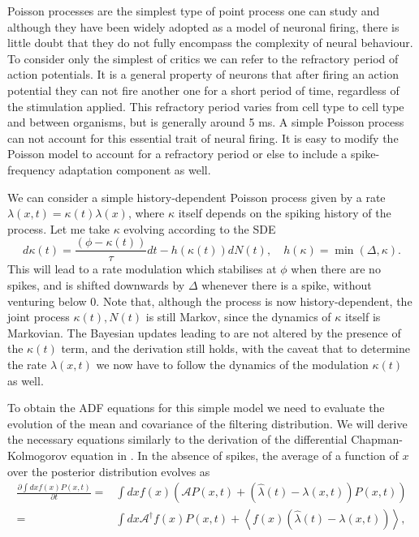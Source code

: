 Poisson processes are the simplest type of point process one can study and although they have been widely adopted as a model of neuronal firing, there is little doubt
that they do not fully encompass the complexity of neural behaviour. To consider only the simplest of critics we can refer to the refractory period of action potentials. It
is a general property of neurons that after firing an action potential they can not fire another one for a short period of time, regardless of the stimulation applied. This
refractory period varies from cell type to cell type and between organisms, but is generally around 5 ms. A simple Poisson process can not account for this
essential trait of neural firing. It is easy to modify the Poisson model to account for a refractory period or else to include a spike-frequency adaptation component
as well.\par
We can consider a simple history-dependent Poisson process given by a rate $\lambda(x,t) = \kappa(t) \lambda(x)$, where $\kappa$ itself depends on the
spiking history of the process. Let me take $\kappa$ evolving according to the SDE
\[
d\kappa(t) = \frac{(\phi - \kappa(t))}{\tau} dt - h(\kappa(t)) dN(t), \quad h(\kappa) = \min(\Delta, \kappa).
\]
This will lead to a rate modulation which stabilises at $\phi$ when there are no spikes, and is shifted downwards by $\Delta$ whenever there is a spike, without
venturing below 0. Note that, although the process is now history-dependent, the joint process $\kappa(t),N(t)$ is still Markov, since the dynamics of $\kappa$ itself
is Markovian. The Bayesian updates leading to  are not altered by the presence of the $\kappa(t)$ term, and the derivation still holds, with the 
caveat that to determine the rate $\lambda(x,t)$ we now have to follow the dynamics of the modulation $\kappa(t)$ as well.\par
To obtain the ADF equations for this simple model we need to evaluate the evolution of the mean and covariance of the filtering distribution. We will derive the
necessary equations similarly to the derivation of the differential Chapman-Kolmogorov equation in \citep{Gardiner2004}. In the absence of spikes, the average of
a function of $x$ over the posterior distribution evolves as
\begin{align*}
\frac{\partial \int dx f(x) P(x,t)}{\partial t} =& \int dx f(x) \left(\mathcal{A} P(x,t) + (\hat{\lambda}(t) - \lambda(x,t) ) P(x,t)\right) \\
=&\int dx \mathcal{A}^\dagger f(x) P(x,t) + \left<f(x) (\hat{\lambda}(t) - \lambda(x,t) ) \right>,
\end{align*}
